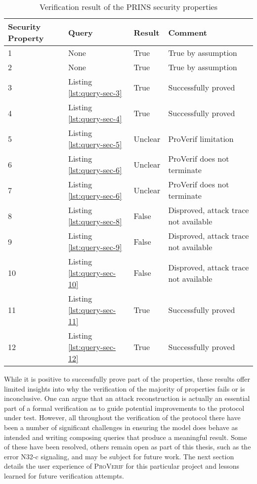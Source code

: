 \begin{table}[ht]
    \centering
    \begin{tabular}{l|l|l|l}
    Security Property & Query                                           & Result  & Comment                               \\
    \hline
    1                 & None                                            & True    & True by assumption                    \\
    2                 & None                                            & True    & True by assumption                    \\
    3                 & Listing \ref{lst:query-sec-3}  & True    & Successfully proved                   \\
    4                 & Listing \ref{lst:query-sec-4}  & True    & Successfully proved                   \\
    5                 & Listing \ref{lst:query-sec-5}  & Unclear & ProVerif limitation                   \\
    6                 & Listing \ref{lst:query-sec-6}  & Unclear & ProVerif does not terminate           \\
    7                 & Listing \ref{lst:query-sec-6}  & Unclear & ProVerif does not terminate           \\
    8                 & Listing \ref{lst:query-sec-8}  & False   & Disproved, attack trace not available \\
    9                 & Listing \ref{lst:query-sec-9}  & False   & Disproved, attack trace not available \\
    10                & Listing \ref{lst:query-sec-10} & False   & Disproved, attack trace not available \\
    11                & Listing \ref{lst:query-sec-11} & True    & Successfully proved                   \\
    12                & Listing \ref{lst:query-sec-12} & True    & Successfully proved\\
    \hline
    \end{tabular}
    \caption{Verification result of the PRINS security properties}
    \label{tab:verification-result}
\end{table}

While it is positive to successfully prove part of the properties, these results offer limited insights into why the verification of the majority of properties fails or is inconclusive.
One can argue that an attack reconstruction is actually an essential part of a formal verification as to guide potential improvements to the protocol under test.
However, all throughout the verification of the protocol there have been a number of significant challenges in ensuring the model does behave as intended and writing composing queries that produce a meaningful result.
Some of these have been resolved, others remain open as part of this thesis, such as the error N32-c signaling, and may be subject for future work.
The next section details the user experience of \textsc{ProVerif} for this particular project and lessons learned for future verification attempts.